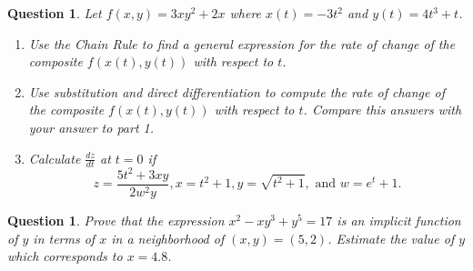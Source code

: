 \documentclass[12pt]{article}
\newtheorem{ques}[theorem]{Question}
\begin{document}
\newpage
\begin{ques}
Let $f(x,y)=3xy^2+2x$ where $x(t)=-3t^2$ and $y(t)=4t^3+t$. 
\begin{enumerate}
    \item Use the Chain Rule to find a general expression for the rate of change of the composite $f(x(t), y(t))$ with respect to $t$.
    \item Use substitution and direct differentiation to compute the rate of change of the composite $f(x(t), y(t))$ with respect to $t$. Compare this answers with your answer to part 1.
    \item Calculate $\frac{dz}{dt}$ at $t=0$ if 
    \[z=\frac{5t^2+3xy}{2w^2y}, x=t^2+1, y=\sqrt{t^2+1}, \text{ and } w=e^t+1.
    \]
\end{enumerate}
\end{ques}


\newpage
\begin{ques}
Prove that the expression $x^2-xy^3+y^5=17$ is an implicit function of $y$ in terms of $x$ in  a neighborhood of $(x,y)=(5,2)$.
Estimate the value of $y$ which corresponds to $x=4.8$.
\end{ques}
\end{document}
